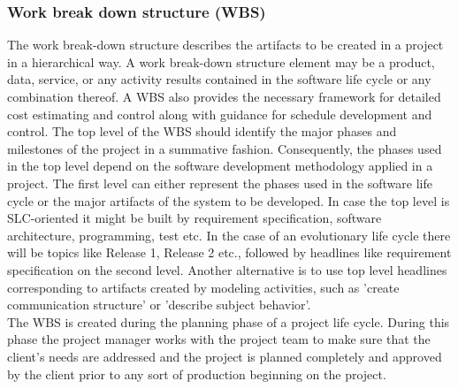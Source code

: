 \subsubsection{\textbf{Work break down structure (WBS)}}
The work break-down structure describes the artifacts to be created in a project in a hierarchical way. A work break-down structure element may be a product, data, service, or any activity results contained in the software life cycle or any combination thereof. A WBS also provides the necessary framework for detailed cost estimating and control along with guidance for schedule development and control. The top level of the WBS should identify the major phases and milestones of the project in a summative fashion. Consequently, the phases used in the top level depend on the software development methodology applied in a project. The first level can either represent the phases used in the software life cycle or the major artifacts of the system to be developed. In case the top level is SLC-oriented it might be built by requirement specification, software architecture, programming, test etc. In the case of an evolutionary life cycle there will be topics like Release 1, Release 2 etc., followed by headlines like requirement specification on the second level.
Another alternative is to use top level headlines corresponding to artifacts created by modeling activities, such as 'create communication structure' or 'describe subject behavior'.
\\
The WBS is created during the planning phase of a project life cycle. During this phase the project manager works with the project team to make sure that the client's needs are addressed and the project is planned completely and approved by the client prior to any sort of production beginning on the project.

